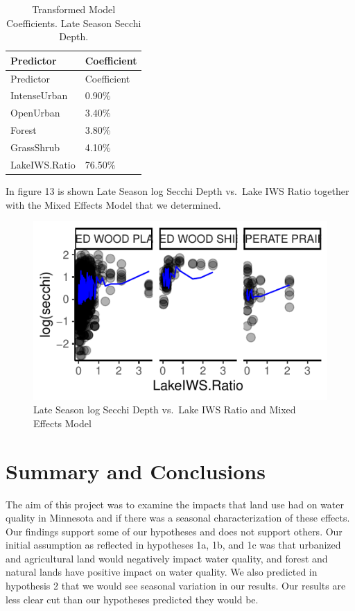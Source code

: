 \documentclass[12pt,]{article}
\begin{document}
\begin{longtable}[]{@{}ll@{}}
\caption{Transformed Model Coefficients. Late Season Secchi
Depth.}\tabularnewline
\toprule
Predictor & Coefficient\tabularnewline
\midrule
\endfirsthead
\toprule
Predictor & Coefficient\tabularnewline
\midrule
\endhead
IntenseUrban & 0.90\%\tabularnewline
OpenUrban & 3.40\%\tabularnewline
Forest & 3.80\%\tabularnewline
GrassShrub & 4.10\%\tabularnewline
LakeIWS.Ratio & 76.50\%\tabularnewline
\bottomrule
\end{longtable}

In figure 13 is shown Late Season log Secchi Depth vs.~Lake IWS Ratio
together with the Mixed Effects Model that we determined.

\begin{figure}
\centering
\includegraphics{Bollt_Greif_Raby_Roth_Project_Final_files/figure-latex/unnamed-chunk-34-1.pdf}
\caption{Late Season log Secchi Depth vs.~Lake IWS Ratio and Mixed
Effects Model}
\end{figure}

\newpage

\hypertarget{summary-and-conclusions}{%
\section{Summary and Conclusions}\label{summary-and-conclusions}}

The aim of this project was to examine the impacts that land use had on
water quality in Minnesota and if there was a seasonal characterization
of these effects. Our findings support some of our hypotheses and does
not support others. Our initial assumption as reflected in hypotheses
1a, 1b, and 1c was that urbanized and agricultural land would negatively
impact water quality, and forest and natural lands have positive impact
on water quality. We also predicted in hypothesis 2 that we would see
seasonal variation in our results. Our results are less clear cut than
our hypotheses predicted they would be.
\end{document}
